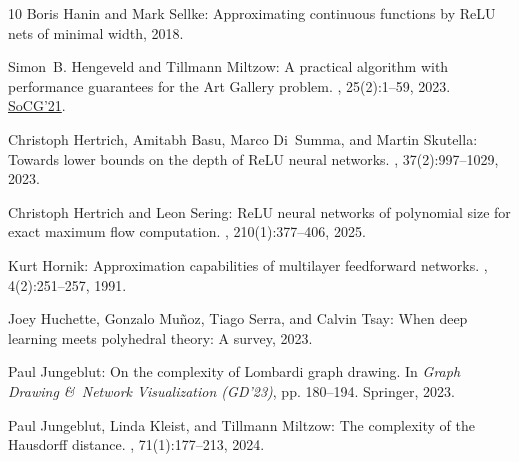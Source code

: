 \begin{thebibliography}{10}
{\sc Boris Hanin and Mark Sellke}: Approximating continuous functions by {ReLU}
  nets of minimal width, 2018.

{\sc Simon~B. Hengeveld and Tillmann Miltzow}: A practical algorithm with
  performance guarantees for the {Art Gallery} problem.
, 25(2):1--59, 2023.
\newblock \prelim
  \href{https://drops.dagstuhl.de/entities/document/10.4230/LIPIcs.SoCG.2021.44}{SoCG'21}.

{\sc Christoph Hertrich, Amitabh Basu, Marco Di~Summa, and Martin Skutella}:
  Towards lower bounds on the depth of {ReLU} neural networks.
, 37(2):997--1029, 2023.
\newblock [\epfmtdoi{10.1137/22M1489332}]

{\sc Christoph Hertrich and Leon Sering}: {ReLU} neural networks of polynomial
  size for exact maximum flow computation.
, 210(1):377--406, 2025.
\newblock [\epfmtdoi{10.1007/s10107-024-02096-x}]

{\sc Kurt Hornik}: Approximation capabilities of multilayer feedforward
  networks.
, 4(2):251--257, 1991.
\newblock [\epfmtdoi{10.1016/0893-6080(91)90009-T}]

{\sc Joey Huchette, Gonzalo Mu{\~{n}}oz, Tiago Serra, and Calvin Tsay}: When
  deep learning meets polyhedral theory: A survey, 2023.

{\sc Paul Jungeblut}: On the complexity of {L}ombardi graph drawing.
\newblock In {\em Graph Drawing \&\ Network Visualization (GD'23)}, pp.
  180--194. Springer, 2023.
\newblock [\epfmtdoi{10.1007/978-3-031-49272-3\_13}]

{\sc Paul Jungeblut, Linda Kleist, and Tillmann Miltzow}: The complexity of the
  {H}ausdorff distance.
, 71(1):177--213, 2024.
\newblock [\epfmtdoi{10.1007/s00454-023-00562-5}]


\end{thebibliography}
